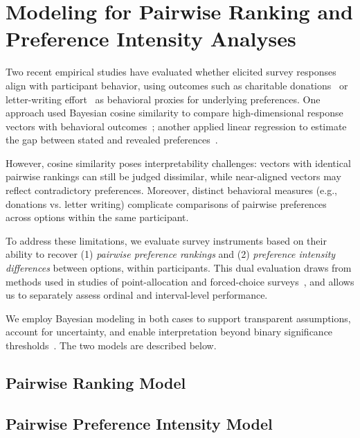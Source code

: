 \section{Modeling for Pairwise Ranking and Preference Intensity Analyses}
\label{sec:quantitative_measures}
Two recent empirical studies have evaluated whether elicited survey responses align with participant behavior, using outcomes such as charitable donations~\cite{chengCanShowWhat2021, cavaille2024cares} or letter-writing effort~\cite{cavaille2024cares} as behavioral proxies for underlying preferences. One approach used Bayesian cosine similarity to compare high-dimensional response vectors with behavioral outcomes~\cite{chengCanShowWhat2021}; another applied linear regression to estimate the gap between stated and revealed preferences~\cite{cavaille2024cares}.

However, cosine similarity poses interpretability challenges: vectors with identical pairwise rankings can still be judged dissimilar, while near-aligned vectors may reflect contradictory preferences. Moreover, distinct behavioral measures (e.g., donations vs. letter writing) complicate comparisons of pairwise preferences across options within the same participant.

To address these limitations, we evaluate survey instruments based on their ability to recover (1) \textit{pairwise preference rankings} and (2) \textit{preference intensity differences} between options, within participants. This dual evaluation draws from methods used in studies of point-allocation and forced-choice surveys~\cite{collewetPreferenceEstimationPoint2023}, and allows us to separately assess ordinal and interval-level performance. 

We employ Bayesian modeling in both cases to support transparent assumptions, account for uncertainty, and enable interpretation beyond binary significance thresholds~\cite{mcelreath2018statistical, kay2016researcher}. The two models are described below.

\subsection{Pairwise Ranking Model}
\label{sec:ordinal_measures}


\subsection{Pairwise Preference Intensity Model}
\label{sec:interval_measures}
